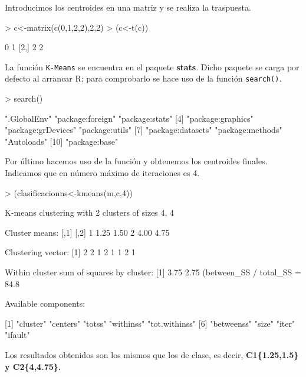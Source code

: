 \documentclass [a4paper] {article}
\begin{document}
\bigskip
Introducimos los centroides en una matriz y se realiza la traspuesta.
\begin{Schunk}
\begin{Sinput}
> c<-matrix(c(0,1,2,2),2,2)
> (c<-t(c))
\end{Sinput}
\begin{Soutput}
     [,1] [,2]
[1,]    0    1
[2,]    2    2
\end{Soutput}
\end{Schunk}

\bigskip
La función \texttt{K-Means} se encuentra en el paquete \textbf{stats}. Dicho paquete se carga por defecto al
arrancar R; para comprobarlo se hace uso de la función \texttt{search()}.
\begin{Schunk}
\begin{Sinput}
> search()
\end{Sinput}
\begin{Soutput}
 [1] ".GlobalEnv"        "package:foreign"   "package:stats"    
 [4] "package:graphics"  "package:grDevices" "package:utils"    
 [7] "package:datasets"  "package:methods"   "Autoloads"        
[10] "package:base"     
\end{Soutput}
\end{Schunk}

\bigskip
Por último hacemos uso de la función y obtenemos los centroides finales. Indicamos que en número máximo de
iteraciones es 4.
\begin{Schunk}
\begin{Sinput}
> (clasificacionns<-kmeans(m,c,4))
\end{Sinput}
\begin{Soutput}
K-means clustering with 2 clusters of sizes 4, 4

Cluster means:
  [,1] [,2]
1 1.25 1.50
2 4.00 4.75

Clustering vector:
[1] 2 2 1 2 1 1 2 1

Within cluster sum of squares by cluster:
[1] 3.75 2.75
 (between_SS / total_SS =  84.8 %)

Available components:

[1] "cluster"      "centers"      "totss"        "withinss"     "tot.withinss"
[6] "betweenss"    "size"         "iter"         "ifault"      
\end{Soutput}
\end{Schunk}

\bigskip
Los resultados obtenidos son los mismos que los de clase, es decir, \textbf{C1\{1.25,1.5\} y C2\{4,4.75\}.}
\end{document}
